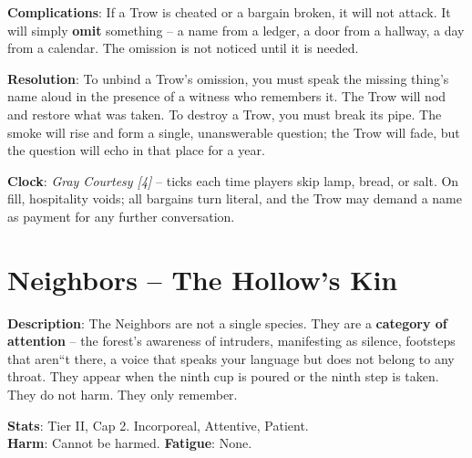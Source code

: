 \noindent\textbf{Complications}: If a Trow is cheated or a bargain broken, it will not attack. It will simply \textbf{omit} something -- a name from a ledger, a door from a hallway, a day from a calendar. The omission is not noticed until it is needed.

\noindent\textbf{Resolution}: To unbind a Trow's omission, you must speak the missing thing's name aloud in the presence of a witness who remembers it. The Trow will nod and restore what was taken. To destroy a Trow, you must break its pipe. The smoke will rise and form a single, unanswerable question; the Trow will fade, but the question will echo in that place for a year.

\noindent\textbf{Clock}: \emph{Gray Courtesy [4]} -- ticks each time players skip lamp, bread, or salt. On fill, hospitality voids; all bargains turn literal, and the Trow may demand a name as payment for any further conversation.

\medskip
{}


\section*{Neighbors -- The Hollow's Kin}

\noindent\textbf{Description}: The Neighbors are not a single species. They are a \textbf{category of attention} -- the forest's awareness of intruders, manifesting as silence, footsteps that aren``t there, a voice that speaks your language but does not belong to any throat. They appear when the ninth cup is poured or the ninth step is taken. They do not harm. They only remember.

\noindent\textbf{Stats}: Tier II, Cap 2. Incorporeal, Attentive, Patient.\\
\textbf{Harm}: Cannot be harmed. \textbf{Fatigue}: None.

